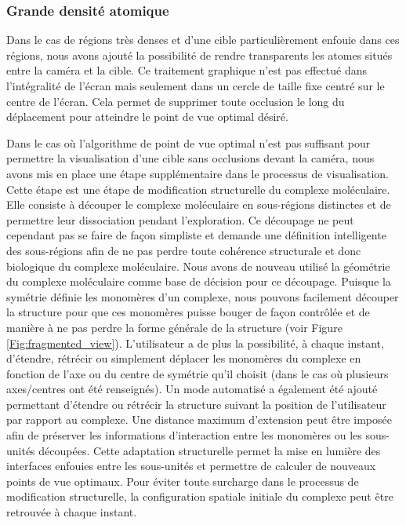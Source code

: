 \subsubsection{Grande densité atomique}

Dans le cas de régions très denses et d'une cible particulièrement enfouie dans ces régions, nous avons ajouté la possibilité de rendre transparents les atomes situés entre la caméra et la cible. Ce traitement graphique n'est pas effectué dans l'intégralité de l'écran mais seulement dans un cercle de taille fixe centré sur le centre de l'écran. Cela permet de supprimer toute occlusion le long du déplacement pour atteindre le point de vue optimal désiré.

Dans le cas où l'algorithme de point de vue optimal n'est pas suffisant pour permettre la visualisation d'une cible sans occlusions devant la caméra, nous avons mis en place une étape supplémentaire dans le processus de visualisation. Cette étape est une étape de modification structurelle du complexe moléculaire. Elle consiste à découper le complexe moléculaire en sous-régions distinctes et de permettre leur dissociation pendant l'exploration. Ce découpage ne peut cependant pas se faire de façon simpliste et demande une définition intelligente des sous-régions afin de ne pas perdre toute cohérence structurale et donc biologique du complexe moléculaire. Nous avons de nouveau utilisé la géométrie du complexe moléculaire comme base de décision pour ce découpage. Puisque la symétrie définie les monomères d'un complexe, nous pouvons facilement découper la structure pour que ces monomères puisse bouger de façon contrôlée et de manière à ne pas perdre la forme générale de la structure (voir Figure \ref{Fig:fragmented_view}). L'utilisateur a de plus la possibilité, à chaque instant, d'étendre, rétrécir ou simplement déplacer les monomères du complexe en fonction de l'axe ou du centre de symétrie qu'il choisit (dans le cas où plusieurs axes/centres ont été renseignés). Un mode automatisé a également été ajouté permettant d'étendre ou rétrécir la structure suivant la position de l'utilisateur par rapport au complexe. Une distance maximum d'extension peut être imposée afin de préserver les informations d'interaction entre les monomères ou les sous-unités découpées. Cette adaptation structurelle permet la mise en lumière des interfaces enfouies entre les sous-unités et permettre de calculer de nouveaux points de vue optimaux. Pour éviter toute surcharge dans le processus de modification structurelle, la configuration spatiale initiale du complexe peut être retrouvée à chaque instant.

